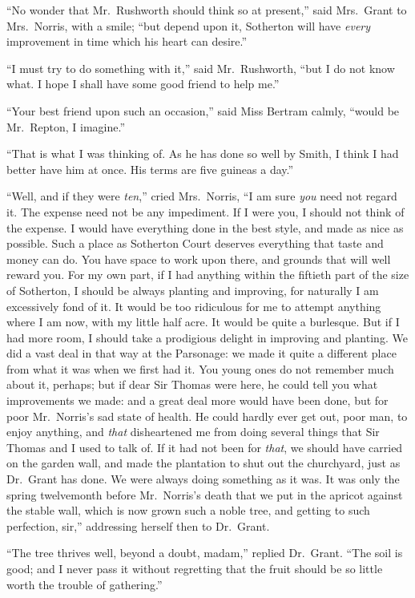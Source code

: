 ``No wonder that Mr.\ Rushworth should think so at present,''
said Mrs.\ Grant to Mrs.\ Norris, with a smile; ``but depend
upon it, Sotherton will have \emph{every} improvement in time
which his heart can desire.''

``I must try to do something with it,'' said Mr.\ Rushworth,
``but I do not know what.  I hope I shall have some good
friend to help me.''

``Your best friend upon such an occasion,'' said Miss
Bertram calmly, ``would be Mr.\ Repton, I imagine.''

``That is what I was thinking of.  As he has done so
well by Smith, I think I had better have him at once.
His terms are five guineas a day.''

``Well, and if they were \emph{ten},'' cried Mrs.\ Norris,
``I am sure \emph{you} need not regard it.  The expense need
not be any impediment.  If I were you, I should not
think of the expense.  I would have everything done
in the best style, and made as nice as possible.
Such a place as Sotherton Court deserves everything that
taste and money can do.  You have space to work upon there,
and grounds that will well reward you.  For my own part,
if I had anything within the fiftieth part of the size
of Sotherton, I should be always planting and improving,
for naturally I am excessively fond of it.  It would be
too ridiculous for me to attempt anything where I am now,
with my little half acre.  It would be quite a burlesque.
But if I had more room, I should take a prodigious delight
in improving and planting.  We did a vast deal in that way
at the Parsonage:  we made it quite a different place
from what it was when we first had it.  You young ones
do not remember much about it, perhaps; but if dear Sir
Thomas were here, he could tell you what improvements
we made:  and a great deal more would have been done,
but for poor Mr.\ Norris's sad state of health.  He could
hardly ever get out, poor man, to enjoy anything, and \emph{that}
disheartened me from doing several things that Sir Thomas
and I used to talk of.  If it had not been for \emph{that},
we should have carried on the garden wall, and made the
plantation to shut out the churchyard, just as Dr.\ Grant
has done.  We were always doing something as it was.
It was only the spring twelvemonth before Mr.\ Norris's
death that we put in the apricot against the stable wall,
which is now grown such a noble tree, and getting
to such perfection, sir,'' addressing herself then to
Dr.\ Grant.

``The tree thrives well, beyond a doubt, madam,'' replied Dr.\ Grant.
``The soil is good; and I never pass it without regretting
that the fruit should be so little worth the trouble of gathering.''

